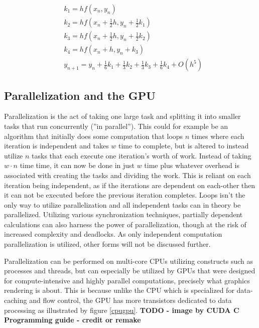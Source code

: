 \begin{equation}\begin{aligned}\label{eq:rk4}
&k_1 = h f(x_n, y_n)\\
&k_2 = h f(x_n + \frac{1}{2}h, y_n + \frac{1}{2}k_1)\\
&k_3 = h f(x_n + \frac{1}{2}h, y_n + \frac{1}{2}k_2)\\
&k_4 = h f(x_n + h, y_n + k_3)\\
&y_{n+1} = y_n + \frac{1}{6}k_1 + \frac{1}{3}k_2 + \frac{1}{3}k_3 + \frac{1}{6}k_4 + O(h^5)
\end{aligned}\end{equation}

\subsection{Parallelization and the GPU}
Parallelization is the act of taking one large task and splitting it into smaller tasks that run concurrently (''in parallel'').
This could for example be an algorithm that initially does some computation that loops $n$ times where each iteration is independent and takes $w$ time to complete, but is altered to instead utilize $n$ tasks that each execute one iteration's worth of work.
Instead of taking $w \cdot n$ time time, it can now be done in just $w$ time plus whatever overhead is associated with creating the tasks and dividing the work.
This is reliant on each iteration being independent, as if the iterations are dependent on each-other then it can not be executed before the previous iteration completes.
Loops isn't the only way to utilize parallelization and all independent tasks can in theory be parallelized. 
Utilizing various synchronization techniques, partially dependent calculations can also harness the power of parallelization, though at the risk of increased complexity and deadlocks.
As only independent computation parallelization is utilized, other forms will not be discussed further.

Parallelization can be performed on multi-core CPUs utilizing constructs such as processes and threads, but can especially be utilized by GPUs that were designed for compute-intensive and highly parallel computations, precisely what graphics rendering is about.
This is because unlike the CPU which is specialized for data-caching and flow control, the GPU has more transistors dedicated to data processing as illustrated by figure \ref{cpugpu}. \textbf{TODO - image by CUDA C Programming guide - credit or remake}

